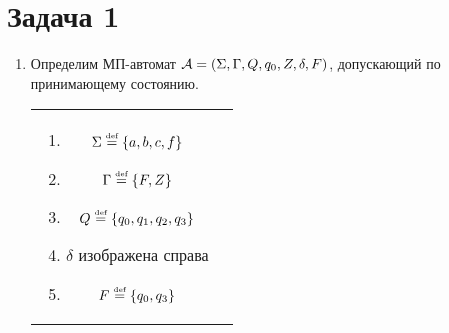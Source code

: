 \documentclass[a4paper]{article}
\def\A{{\cal A}}
\def\eqdef{\overset{\mbox{\tiny def}}{=}}
\begin{document}
\section*{Задача 1}
\begin{enumerate}
\item Определим МП-автомат $\A=(\Sigma,\Gamma,Q,q_0,Z,\delta,F)$, допускающий по принимающему состоянию.\newline
\begin{tabular}{cc}
\begin{minipage}{0.4\textwidth}
\begin{enumerate}
\item $\Sigma\eqdef\{a,b,c,f\}$
\item $\Gamma\eqdef\{F,Z\}$
\item $Q\eqdef\{q_0,q_1,q_2,q_3\}$
\item $\delta$ изображена справа
\item $F\eqdef\{q_0,q_3\}$
\end{enumerate}
\end{minipage}
&
\begin{minipage}{0.6\textwidth}


\end{minipage}
\end{tabular}
\end{enumerate}
\end{document}
